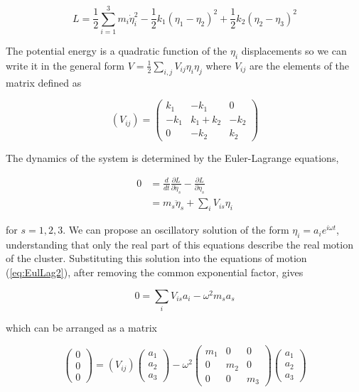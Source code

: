\begin{equation}
  L= \frac{1}{2}\sum_{i=1}^3 m_i \dot{\eta}_i^2-\frac{1}{2}k_1(\eta_1-\eta_2)^2+\frac{1}{2}k_2(\eta_2-\eta_3)^2
\end{equation}

The potential energy is a quadratic function of the $\eta_i$ displacements so we can write it in the general form $V=\frac{1}{2}\sum_{i,j}V_{ij}\eta_i\eta_j$ where $V_{ij}$ are the elements of the matrix defined as

\begin{equation}
  (V_{ij})=\left( \begin{array}{ccc} k_1 & -k_1 & 0 \\ -k_1 & k_1+k_2 & -k_2 \\ 0 & -k_2 & k_2 \end{array} \right)
\end{equation}

The dynamics of the system is determined by the Euler-Lagrange equations,

\begin{align}
  0 & = \frac{d}{dt}\frac{\partial L}{\partial \dot{\eta}_s}-\frac{\partial L}{\partial \eta_s} \label{eq:EulLag1} \\
    & = m_s \ddot{\eta}_s + \sum_i V_{is} \eta_i \label{eq:EulLag2}
\end{align}

\noindent for $s=1,2,3$. 
We can propose an oscillatory solution of the form $\eta_i=a_ie^{i\omega t}$, understanding that only the real part of this equations describe the real motion of the cluster. 
Substituting this solution into the equations of motion (\ref{eq:EulLag2}), after removing the common exponential factor, gives

\begin{equation}
  0=\sum_i V_{is}a_i-\omega^2m_sa_s
\end{equation}

which can be arranged as a matrix

\begin{equation}
  \left( 
    \begin{array}{c} 
      0\\ 0\\ 0 
    \end{array}
  \right) = (V_{ij}) \left(
    \begin{array}{c}
      a_1 \\ a_2 \\ a_3 
    \end{array}
  \right) - \omega^2 \left(
    \begin{array}{ccc}
      m_1 & 0 & 0 \\ 0 & m_2 & 0 \\ 0 & 0 & m_3
    \end{array}\right) \left(
    \begin{array}{c} 
      a_1 \\ a_2 \\ a_3 
    \end{array}
  \right)
\end{equation}

